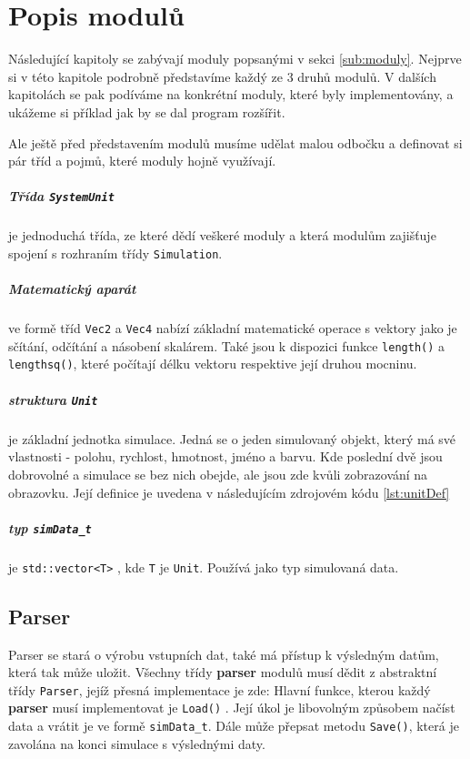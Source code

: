 \chapter{Popis modulů}
Následující kapitoly se zabývají moduly popsanými v sekci \ref{sub:moduly}.
Nejprve si v této kapitole podrobně představíme každý ze 3 druhů modulů.
V dalších kapitolách se pak podíváme na konkrétní moduly, které byly implementovány, a ukážeme si příklad jak by se dal program rozšířit.

Ale ještě před představením modulů musíme udělat malou odbočku a definovat si pár tříd a pojmů, které moduly hojně využívají.
\paragraph{Třída \texttt{SystemUnit}}
je jednoduchá třída, ze které dědí veškeré moduly a která modulům zajišťuje spojení s rozhraním třídy \texttt{Simulation}.
\paragraph{Matematický aparát}
ve formě tříd \texttt{Vec2} a \texttt{Vec4} nabízí základní matematické operace s vektory jako je sčítání, odčítání a násobení skalárem. Také jsou k dispozici funkce
\texttt{length()} a \texttt{lengthsq()}, které počítají délku vektoru respektive její druhou mocninu.
\paragraph{struktura \texttt{Unit}}
je základní jednotka simulace. Jedná se o jeden simulovaný objekt, který má své vlastnosti - polohu, rychlost, hmotnost, jméno a barvu. Kde poslední dvě jsou dobrovolné a simulace se bez nich obejde, ale jsou zde kvůli zobrazování na obrazovku. Její definice je uvedena v následujícím zdrojovém kódu \ref{lst:unitDef}
\paragraph{typ \texttt{simData\_t}} je \texttt{std::vector<T>} , kde \texttt{T} je \texttt{Unit}. Používá jako typ simulovaná data.
\section{Parser}
Parser se stará o výrobu vstupních dat, také má přístup k výsledným datům, která tak může uložit. Všechny třídy \textbf{parser} modulů musí dědit z abstraktní třídy \texttt{Parser}, jejíž přesná implementace je zde:
Hlavní funkce, kterou každý \textbf{parser} musí implementovat je \texttt{Load()} . Její úkol je libovolným způsobem načíst data a vrátit je ve formě \texttt{simData\_t}. Dále může přepsat metodu \texttt{Save()}, která je zavolána na konci simulace s výslednými daty.
